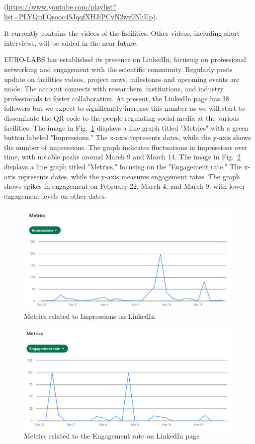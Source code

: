 (\url{https://www.youtube.com/playlist?list=PLYQjjFQsooc45JqqfXHJiPCyN2wz9NhUp}). 

It currently contains the videos of the facilities.  Other videos, including short interviews, will be added in the near future.

EURO-LABS has established its presence on LinkedIn, focusing on professional networking and engagement with the scientific community. Regularly posts update on facilities videos, project news, milestones and upcoming events are made. The account connects with researchers, institutions, and industry professionals to foster collaboration. At present, the LinkedIn page has 38 followers but we expect to significantly increase this number as we will start to disseminate the QR code to the people regulating social media at the various  facilities.  The image in Fig.~\ref{fig:WP5-1a} displays a line graph titled "Metrics" with a green button labeled "Impressions." The x-axis represents dates, while the y-axis shows the number of impressions. The graph indicates fluctuations in impressions over time, with notable peaks around March 9 and March 14.
The image  in Fig.~\ref{fig:WP5-1b} displays a line graph titled "Metrics," focusing on the "Engagement rate." The x-axis represents dates, while the y-axis measures engagement rates. The graph shows spikes in engagement on February 22, March 4, and March 9, with lower engagement levels on other dates.


\begin{figure}[!h]
    \centering
    \includegraphics[width=1.0\linewidth]{graphics/WP5-1a.png}
    \caption{Metrics related to Impressions on LinkedIn
}
    \label{fig:WP5-1a}
\end{figure}

\begin{figure}[!h]
    \centering
    \includegraphics[width=1.0\linewidth]{graphics/WP5-1b.png}
    \caption{Metrics related to the Engagement rate on LinkedIn page
}
    \label{fig:WP5-1b}
\end{figure}

